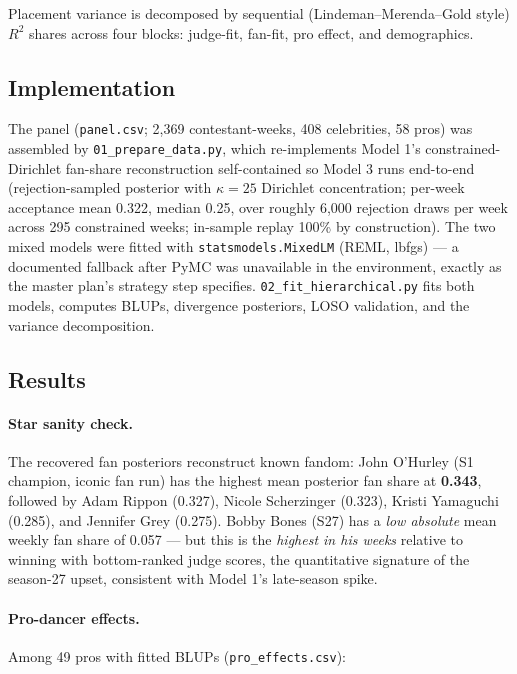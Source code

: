 \documentclass[11pt]{article}
\begin{document}
Placement variance is decomposed by sequential (Lindeman--Merenda--Gold
style) $R^2$ shares across four blocks: judge-fit, fan-fit, pro effect,
and demographics.

\subsection{Implementation}

The panel (\texttt{panel.csv}; 2{,}369 contestant-weeks, 408
celebrities, 58 pros) was assembled by \texttt{01\_prepare\_data.py},
which re-implements Model 1's constrained-Dirichlet fan-share
reconstruction self-contained so Model 3 runs end-to-end
(rejection-sampled posterior with $\kappa = 25$ Dirichlet concentration;
per-week acceptance mean 0.322, median 0.25, over roughly 6{,}000
rejection draws per week across 295 constrained weeks; in-sample replay
100\% by construction). The two mixed models were fitted with
\texttt{statsmodels.MixedLM} (REML, lbfgs) --- a documented fallback
after PyMC was unavailable in the environment, exactly as the master
plan's strategy step specifies. \texttt{02\_fit\_hierarchical.py} fits
both models, computes BLUPs, divergence posteriors, LOSO validation,
and the variance decomposition.

\subsection{Results}

\paragraph{Star sanity check.} The recovered fan posteriors reconstruct
known fandom: John O'Hurley (S1 champion, iconic fan run) has the
highest mean posterior fan share at \textbf{0.343}, followed by Adam
Rippon (0.327), Nicole Scherzinger (0.323), Kristi Yamaguchi (0.285),
and Jennifer Grey (0.275). Bobby Bones (S27) has a \emph{low absolute}
mean weekly fan share of 0.057 --- but this is the \emph{highest in his
weeks} relative to winning with bottom-ranked judge scores, the
quantitative signature of the season-27 upset, consistent with Model
1's late-season spike.

\paragraph{Pro-dancer effects.} Among 49 pros with fitted BLUPs
(\texttt{pro\_effects.csv}):
\end{document}
